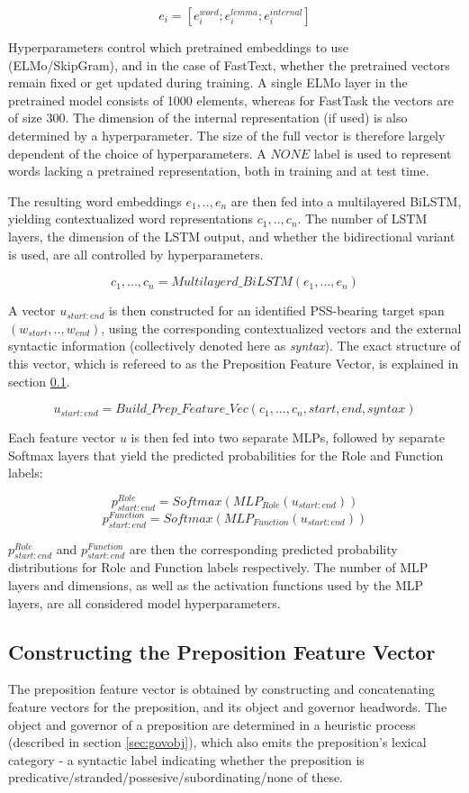 $$ e_i = [e^{word}_i;e^{lemma}_i;e^{internal}_i] $$

Hyperparameters control which pretrained embeddings to use (ELMo/SkipGram), and in the case of FastText, whether the pretrained vectors remain fixed or get updated during training. A single ELMo layer in the pretrained model consists of 1000 elements, whereas for FastTask the vectors are of size 300. The dimension of the internal representation (if used) is also determined by a hyperparameter. The size of the full vector is therefore largely dependent of the choice of hyperparameters. A $NONE$ label is used to represent words lacking a pretrained representation, both in training and at test time.

The resulting word embeddings $e_1, .. ,e_n$ are then fed into a multilayered BiLSTM, yielding contextualized word representations $c_1, .. ,c_n$. The number of LSTM layers, the dimension of the LSTM output, and whether the bidirectional variant is used, are all controlled by hyperparameters.

$$ c_1, ... , c_n = Multilayerd\_BiLSTM(e_1, ... ,e_n)$$

A vector $u_{start:end}$ is then constructed for an identified PSS-bearing target span $(w_{start}, .., w_{end})$, using the corresponding contextualized vectors and the external syntactic information (collectively denoted here as \emph{syntax}). The exact structure of this vector, which is refereed to as the Preposition Feature Vector, is explained in section \ref{sec:enrichedvec}. 

$$u_{start:end} = Build\_Prep\_Feature\_Vec(c_1, ... ,c_n, start, end, syntax)$$

Each feature vector $u$ is then fed into two separate MLPs, followed by separate Softmax layers that
yield the predicted probabilities for the Role and
Function labels:

$$ p^{Role}_{start:end} = Softmax(MLP_{Role}(u_{start:end})) $$
$$ p^{Function}_{start:end} = Softmax(MLP_{Function}(u_{start:end})) $$

$p^{Role}_{start:end}$ and $p^{Function}_{start:end}$ are then the corresponding predicted probability distributions for Role and Function labels respectively. The number of MLP layers and dimensions, as well as the activation functions used by the MLP layers, are all considered model hyperparameters. 

\subsection{Constructing the Preposition Feature Vector} \label{sec:enrichedvec}
The preposition feature vector is obtained by constructing and concatenating feature vectors for the preposition, and its object and governor headwords. The object and governor of a preposition are determined in a heuristic process (described in section \ref{sec:govobj}), which also emits the preposition's lexical category - a syntactic label indicating whether the preposition is
predicative/stranded/possesive/subordinating/none of these. 

